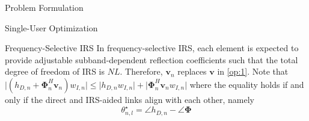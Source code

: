 \documentclass{IEEEtran}
\begin{document}
\begin{section}{Problem Formulation}
\begin{subsection}{Single-User Optimization}
		\begin{subsubsection}{Frequency-Selective IRS}
			In frequency-selective IRS, each element is expected to provide adjustable subband-dependent reflection coefficients such that the total degree of freedom of IRS is $NL$. Therefore, $\boldsymbol{v}_n$ replaces $\boldsymbol{v}$ in \ref{op:1}. Note that $\lvert{(h_{D,n}+\boldsymbol{\Phi}_n^H\boldsymbol{v}_n)w_{I,n}}\rvert \le \lvert{h_{D,n}w_{I,n}}\rvert+\lvert{\boldsymbol{\Phi}_n^H\boldsymbol{v}_nw_{I,n}}\rvert$ where the equality holds if and only if the direct and IRS-aided links align with each other, namely
			\begin{equation}
				\theta_{n,l}^\star = \angle{h}_{D,n} - \angle{\boldsymbol{\Phi}}
			\end{equation}
		\end{subsubsection}


\end{subsection}
\end{section}
\end{document}
